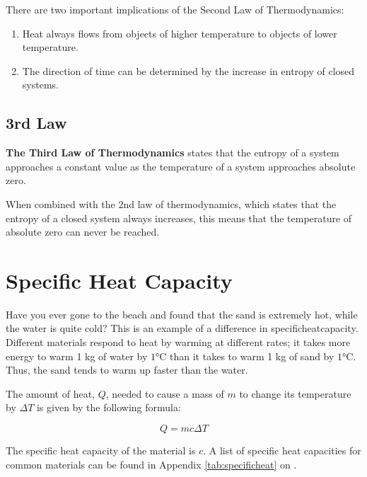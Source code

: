 			There are two important implications of the Second Law of Thermodynamics:
			\begin{enumerate}
				\item Heat always flows from objects of higher temperature to objects of lower temperature.  
				\item The direction of time can be determined by the increase in entropy of closed systems.  
			\end{enumerate}
			
			
			
	\subsection{3rd Law}
 \textbf{The Third Law of Thermodynamics} states that the entropy of a system approaches a constant value as the temperature of a system approaches absolute zero.  
 
 
 
 When combined with the 2nd law of thermodynamics, which states that the entropy of a closed system always increases, this means that the temperature of absolute zero can never be reached.  
	
	
	
	\section{Specific Heat Capacity}
	
	Have you ever gone to the beach and found that the sand is extremely hot, while the water is quite cold?  This is an example of a difference in \gls{specificheatcapacity}.  Different materials respond to heat by warming at different rates; it takes more energy to warm 1 kg of water by $1 \si{\degreeCelsius}$ than it takes to warm 1 kg of sand by $1 \si{\degreeCelsius}$.  Thus, the sand tends to warm up faster than the water.  
	
	The amount of heat, $Q$, needed to cause a mass of $m$ to change its temperature by $\Delta T$ is given by the following formula:
	
					\begin{mdframed}[backgroundcolor=orange!20!white]
		\begin{equation}
			Q = m c \Delta T 
			\label{eqn:specificheat}
		\end{equation}
	\end{mdframed}
	The specific heat capacity of the material is $c$.  A list of specific heat capacities for common materials can be found in Appendix \ref{tab:specificheat} on  .
	
